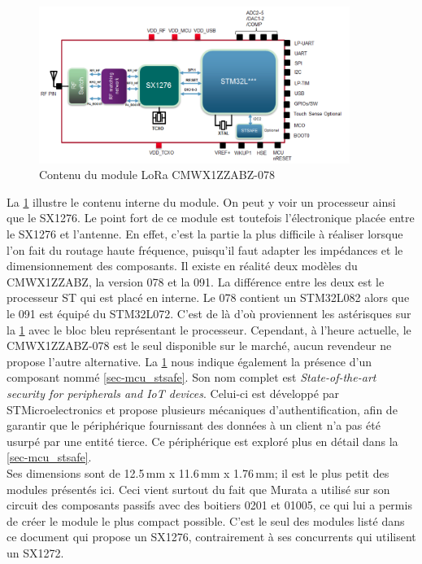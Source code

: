 \begin{figure}[ht!]
    \centering
    \includegraphics[width=0.9\textwidth]{Figures/Hardware/murata_bloc_diagram.PNG}
    \caption{Contenu du module LoRa CMWX1ZZABZ-078}
    \label{fig-murata_bloc_diagram}
\end{figure}

La \cref{fig-murata_bloc_diagram} illustre le contenu interne du module. On peut y voir un processeur ainsi que le SX1276. Le point fort de ce module est toutefois l'électronique placée entre le SX1276 et l'antenne. En effet, c'est la partie la plus difficile à réaliser lorsque l'on fait du routage haute fréquence, puisqu'il faut adapter les impédances et le dimensionnement des composants. Il existe en réalité deux modèles du CMWX1ZZABZ, la version 078 et la 091. La différence entre les deux est le processeur ST qui est placé en interne. Le 078 contient un STM32L082 alors que le 091 est équipé du STM32L072. C'est de là d'où proviennent les astérisques sur la \cref{fig-murata_bloc_diagram} avec le bloc bleu représentant le processeur. Cependant, à l'heure actuelle, le CMWX1ZZABZ-078 est le seul disponible sur le marché, aucun revendeur ne propose l'autre alternative. La \cref{fig-murata_bloc_diagram} nous indique également la présence d'un composant nommé \cref{sec-mcu_stsafe}. Son nom complet est \textit{State-of-the-art security for peripherals and IoT devices}. Celui-ci est développé par STMicroelectronics et propose plusieurs mécaniques d'authentification, afin de garantir que le périphérique fournissant des données à un client n'a pas été usurpé par une entité tierce. Ce périphérique est exploré plus en détail dans la \cref{sec-mcu_stsafe}.\\

Ses dimensions sont de 12.5\,mm x 11.6\,mm x 1.76\,mm; il est le plus petit des modules présentés ici. Ceci vient surtout du fait que Murata a utilisé sur son circuit des composants passifs avec des boitiers 0201 et 01005, ce qui lui a permis de créer le module le plus compact possible. C'est le seul des modules listé dans ce document qui propose un SX1276, contrairement à ses concurrents qui utilisent un SX1272. \\

